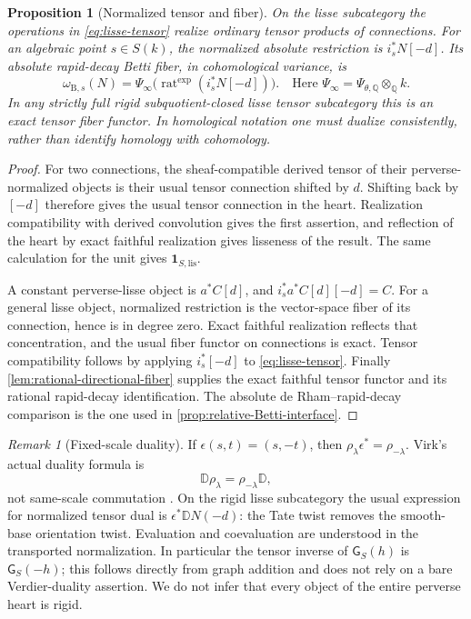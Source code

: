 \documentclass[11pt]{article}
\numberwithin{equation}{section}
\newtheorem{proposition}[proposition]{Proposition}
\theoremstyle{definition}
\theoremstyle{remark}
\newtheorem{remark}[remark]{Remark}
\newcommand{\Q}{\mathbb Q}
\newcommand{\rat}{\operatorname{rat}}
\newcommand{\B}{\mathrm B}
\newcommand{\lis}{\mathrm{lis}}
\newcommand{\one}{\mathbf1}
\newcommand{\DD}{\mathbb D}
\begin{document}
\begin{proposition}[Normalized tensor and fiber]\label{prop:normalization}\label{prop:absolute-rd-input}
On the lisse subcategory the operations in \eqref{eq:lisse-tensor} realize
ordinary tensor products of connections. For an algebraic point $s\in S(k)$,
the normalized absolute restriction is $i_s^*N[-d]$. Its absolute
rapid-decay Betti fiber, in cohomological variance, is
\begin{equation}\label{eq:betti-fiber}
  \omega_{\B,s}(N)
  =\Psi_\infty\bigl(\rat^{\exp}(i_s^*N[-d])\bigr).
  \quad\text{Here }\Psi_\infty=\Psi_{\theta,\Q}\otimes_\Q k.
\end{equation}
In any strictly full rigid subquotient-closed lisse tensor subcategory this
is an exact tensor fiber functor. In homological notation one must dualize
consistently, rather than identify homology with cohomology.
\end{proposition}
\begin{proof}
For two connections, the sheaf-compatible derived tensor of their
perverse-normalized objects is their usual tensor connection shifted by
$d$. Shifting back by $[-d]$ therefore gives the usual tensor connection
in the heart. Realization compatibility with derived convolution gives the
first assertion, and reflection of the heart by exact faithful realization
gives lisseness of the result. The same calculation for the unit gives
$\one_{S,\lis}$.

A constant perverse-lisse object is $a^*C[d]$, and
$i_s^*a^*C[d][-d]=C$. For a general lisse object, normalized restriction
is the vector-space fiber of its connection, hence is in degree zero.
Exact faithful realization reflects that concentration, and the usual
fiber functor on connections is exact. Tensor compatibility follows by
applying $i_s^*[-d]$ to \eqref{eq:lisse-tensor}.
Finally \cref{lem:rational-directional-fiber} supplies the exact faithful
tensor functor and its rational rapid-decay identification. The absolute
de Rham--rapid-decay comparison is the one used in
\cref{prop:relative-Betti-interface}.
\end{proof}

\begin{remark}[Fixed-scale duality]\label{rem:duality}
If $\epsilon(s,t)=(s,-t)$, then
$\rho_\lambda\epsilon^*=\rho_{-\lambda}$. Virk's actual duality formula is
\[
  \DD\rho_\lambda=\rho_{-\lambda}\DD,
\]
not same-scale commutation \cite[Theorem~6.13]{Virk}. On the rigid lisse
subcategory the usual expression for normalized tensor dual is
$\epsilon^*\DD N(-d)$: the Tate twist removes the smooth-base orientation
twist. Evaluation and coevaluation are understood in the transported
normalization. In particular the tensor inverse of $\mathsf G_S(h)$ is
$\mathsf G_S(-h)$; this follows directly from graph addition and does not
rely on a bare Verdier-duality assertion. We do not infer that every
object of the entire perverse heart is rigid.
\end{remark}
\end{document}
